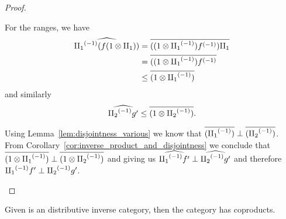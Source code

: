 \begin{proof}
\begin{enumerate}[{(}i{)}]
    For the ranges, we have
    \begin{align*}
      \widehat{{\amalg_{1}}^{(-1)} (f (1\otimes\amalg_{1}))} &=
      \overline{((1\otimes{\amalg_{1}}^{(-1)}){f}^{(-1)})\amalg_{1}}\\
      &= \overline{((1\otimes{\amalg_{1}}^{(-1)}){f}^{(-1)}}\\
      &\le \overline{(1\otimes{\amalg_{1}}^{(-1)})}
    \end{align*}
    and similarly
    \[
      \widehat{{\amalg_{2}}^{(-1)} g'} \le \overline{(1\otimes{\amalg_{2}}^{(-1)})}.
    \]

    Using Lemma~\ref{lem:disjointness_various}
    we know that $\overline{({\amalg_{1}}^{(-1)})}\perp \overline{({\amalg_{2}}^{(-1)})}$. From
    Corollary~\ref{cor:inverse_product_and_disjointness}
    we conclude that $\overline{(1\otimes{\amalg_{1}}^{(-1)})}\perp \overline{(1\otimes{\amalg_{2}}^{(-1)})}$ and giving us
    $\widehat{{\amalg_{1}}^{(-1)}f'} \perp \widehat{{\amalg_{2}}^{(-1)}g'}$ and therefore ${\amalg_{1}}^{(-1)}f' \perp {\amalg_{2}}^{(-1)}g'$.
  \end{enumerate}
\end{proof}
\begin{proposition}\label{thm:x_tilde_has_coproducts_if_x_is_inverse_distributive_category}
  Given \X is an distributive inverse category, then the category \Xt has coproducts.
\end{proposition}
